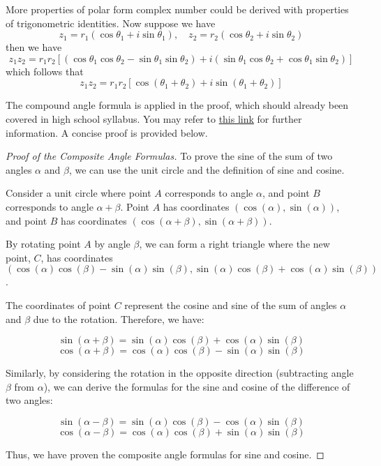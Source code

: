 More properties of polar form complex number could be derived with properties of trigonometric identities.
Now suppose we have 
$$z_1=r_1\left(\cos\theta_1+i\sin\theta_1\right),\quad z_2=r_2\left(\cos\theta_2+i\sin\theta_2\right)$$
then we have
$$z_1z_2=r_1r_2\left[(\cos\theta_1\cos\theta_2-\sin\theta_1\sin\theta_2)+i(\sin\theta_1\cos\theta_2+\cos\theta_1\sin\theta_2)\right]$$
which follows that
\begin{equation} \label{polarprod}
    z_1z_2=r_1r_2\left[\cos\left(\theta_1+\theta_2\right)+i\sin\left(\theta_1+\theta_2\right)\right]
\end{equation}

\begin{remark}
The compound angle formula is applied in the proof, which should already been covered in high school
syllabus. You may refer to \href{https://en.wikipedia.org/wiki/List_of_trigonometric_identities}{this link} for further information.
A concise proof is provided below.
\begin{proof}[Proof of the Composite Angle Formulas]
    To prove the sine of the sum of two angles \( \alpha \) and \( \beta \), we can use the unit circle and the definition of sine and cosine.
    
    Consider a unit circle where point \( A \) corresponds to angle \( \alpha \), and point \( B \) corresponds to angle \( \alpha + \beta \). Point \( A \) has coordinates \( (\cos(\alpha), \sin(\alpha)) \), and point \( B \) has coordinates \( (\cos(\alpha + \beta), \sin(\alpha + \beta)) \).
    
    By rotating point \( A \) by angle \( \beta \), we can form a right triangle where the new point, \( C \), has coordinates \( (\cos(\alpha)\cos(\beta) - \sin(\alpha)\sin(\beta), \sin(\alpha)\cos(\beta) + \cos(\alpha)\sin(\beta)) \).
    
    The coordinates of point \( C \) represent the cosine and sine of the sum of angles \( \alpha \) and \( \beta \) due to the rotation. Therefore, we have:
    
    \[
    \sin(\alpha + \beta) = \sin(\alpha)\cos(\beta) + \cos(\alpha)\sin(\beta)
    \]
    \[
    \cos(\alpha + \beta) = \cos(\alpha)\cos(\beta) - \sin(\alpha)\sin(\beta)
    \]
    
    Similarly, by considering the rotation in the opposite direction (subtracting angle \( \beta \) from \( \alpha \)), we can derive the formulas for the sine and cosine of the difference of two angles:
    
    \[
    \sin(\alpha - \beta) = \sin(\alpha)\cos(\beta) - \cos(\alpha)\sin(\beta)
    \]
    \[
    \cos(\alpha - \beta) = \cos(\alpha)\cos(\beta) + \sin(\alpha)\sin(\beta)
    \]
    
    Thus, we have proven the composite angle formulas for sine and cosine.

    \end{proof}
\end{remark}

